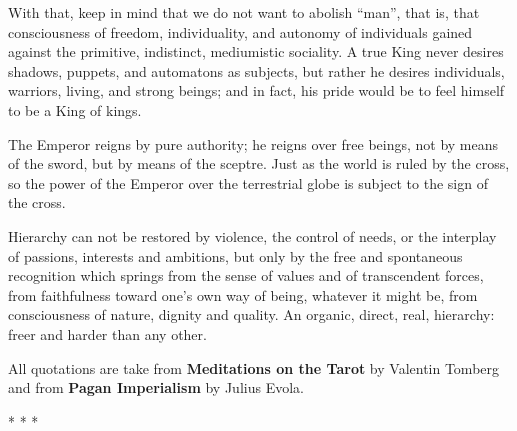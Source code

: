 \begin{quotationx}
With that, keep in mind that we do not want to abolish ``man'', that is, that consciousness of freedom, individuality, and autonomy of individuals gained against the primitive, indistinct, mediumistic sociality. A true King never desires shadows, puppets, and automatons as subjects, but rather he desires individuals, warriors, living, and strong beings; and in fact, his pride would be to feel himself to be a King of kings.

The Emperor reigns by pure authority; he reigns over free beings, not by means of the sword, but by means of the sceptre. Just as the world is ruled by the cross, so the power of the Emperor over the terrestrial globe is subject to the sign of the cross.

Hierarchy can not be restored by violence, the control of needs, or the interplay of passions, interests and ambitions, but only by the free and spontaneous recognition which springs from the sense of values and of transcendent forces, from faithfulness toward one's own way of being, whatever it might be, from consciousness of nature, dignity and quality. An organic, direct, real, hierarchy: freer and harder than any other.
\end{quotationx}

All quotations are take from \textbf{Meditations on the Tarot} by Valentin Tomberg and from \textbf{Pagan Imperialism} by Julius Evola.



\begin{center}* * *\end{center}

